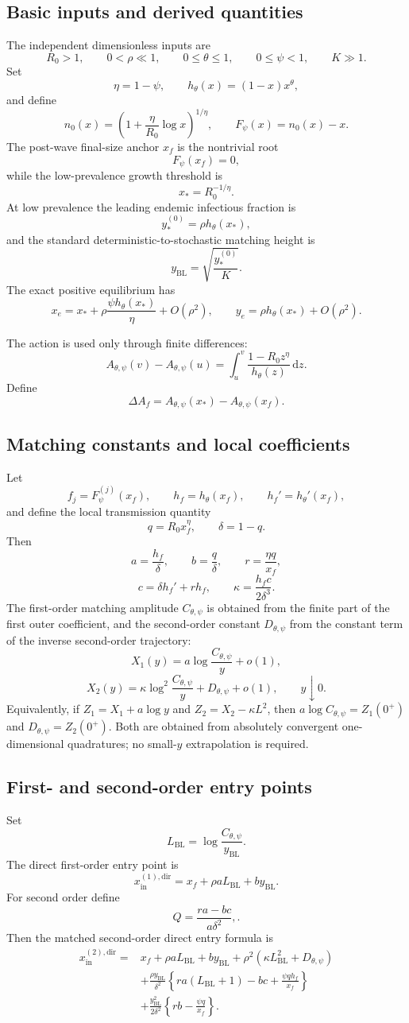 \documentclass[11pt]{article}
\newcommand{\Rzero}{R_0}
\newcommand{\hth}{h_\theta}
\newcommand{\Fpsi}{F_\psi}
\newcommand{\Apsi}{A_{\theta,\psi}}
\newcommand{\Cpsi}{C_{\theta,\psi}}
\newcommand{\Dpsi}{D_{\theta,\psi}}
\newcommand{\xf}{x_f}
\newcommand{\xs}{x_*}
\newcommand{\yin}{y_{\mathrm{BL}}}
\newcommand{\xin}{x_{\mathrm{in}}}
\newcommand{\dd}{\,\mathrm{d}}
\begin{document}
\subsection{Basic inputs and derived quantities}
The independent dimensionless inputs are
\[
\Rzero>1,\qquad 0<\rho\ll1,\qquad 0\leq\theta\leq1,\qquad 0\leq\psi<1,\qquad K\gg1.
\]
Set
\[
\eta=1-\psi,\qquad \hth(x)=(1-x)x^\theta,
\]
and define
\[
n_0(x)=\left(1+\frac{\eta}{\Rzero}\log x\right)^{1/\eta},
\qquad
\Fpsi(x)=n_0(x)-x.
\]
The post-wave final-size anchor \(\xf\) is the nontrivial root
\[
\Fpsi(\xf)=0,
\]
while the low-prevalence growth threshold is
\[
\xs=\Rzero^{-1/\eta}.
\]
At low prevalence the leading endemic infectious fraction is
\[
y_*^{(0)}=\rho\hth(\xs),
\]
and the standard deterministic-to-stochastic matching height is
\[
\yin=\sqrt{\frac{y_*^{(0)}}{K}}.
\]
The exact positive equilibrium has
\[
x_e=\xs+\rho\frac{\psi\hth(\xs)}{\eta}+O(\rho^2),
\qquad
y_e=\rho\hth(\xs)+O(\rho^2).
\]

The action is used only through finite differences:
\[
\Apsi(v)-\Apsi(u)
=\int_u^v \frac{1-\Rzero z^\eta}{\hth(z)}\dd z.
\]
Define
\[
\Delta A_f=\Apsi(\xs)-\Apsi(\xf).
\]

\subsection{Matching constants and local coefficients}
Let
\[
f_j=\Fpsi^{(j)}(\xf),\qquad h_f=\hth(\xf),\qquad h_f'=\hth'(\xf),
\]
and define the local transmission quantity
\[
q=\Rzero\xf^\eta,\qquad \delta=1-q.
\]
Then
\[
a=\frac{h_f}{\delta},\qquad b=\frac{q}{\delta},\qquad r=\frac{\eta q}{\xf},
\]
\[
c=\delta h_f'+rh_f,
\qquad
\kappa=\frac{h_fc}{2\delta^3}.
\]
The first-order matching amplitude \(\Cpsi\) is obtained from the finite part of the first outer coefficient, and the second-order constant \(\Dpsi\) from the constant term of the inverse second-order trajectory:
\[
X_1(y)=a\log\frac{\Cpsi}{y}+o(1),
\]
\[
X_2(y)=\kappa\log^2\frac{\Cpsi}{y}+\Dpsi+o(1),
\qquad y\downarrow0.
\]
Equivalently, if \(Z_1=X_1+a\log y\) and \(Z_2=X_2-\kappa L^2\), then \(a\log\Cpsi=Z_1(0^+)\) and \(\Dpsi=Z_2(0^+)\).  Both are obtained from absolutely convergent one-dimensional quadratures; no small-\(y\) extrapolation is required.

\subsection{First- and second-order entry points}
Set
\[
L_{\mathrm{BL}}=\log\frac{\Cpsi}{\yin}.
\]
The direct first-order entry point is
\[
\xin^{(1),\mathrm{dir}}
=\xf+\rho aL_{\mathrm{BL}}+b\yin.
\]
For second order define
\[
Q=\frac{ra-bc}{a\delta^2},
.
\]
Then the matched second-order direct entry formula is
\[
\begin{aligned}
\xin^{(2),\mathrm{dir}}={}&\xf+\rho aL_{\mathrm{BL}}+b\yin
+\rho^2\left(\kappa L_{\mathrm{BL}}^2+\Dpsi\right)\\
&+\frac{\rho\yin}{\delta^2}
\left\{ra(L_{\mathrm{BL}}+1)-bc+\frac{\psi qh_f}{\xf}\right\}\\
&+\frac{\yin^2}{2\delta^2}
\left\{rb-\frac{\psi q}{\xf}\right\}.
\end{aligned}
\]
\end{document}

